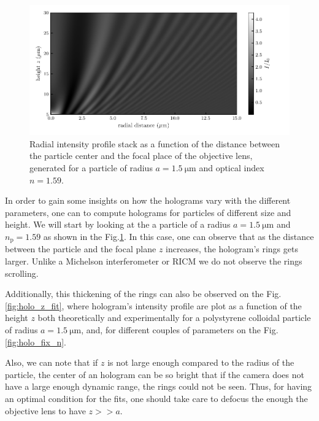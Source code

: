 \begin{figure}[H]
	\centering
	\includegraphics{02_body/chapter2/images/holo_size_exemple/holos_only_z.pdf}
	\caption{Radial intensity profile stack as a function of the distance between the particle center and the focal place of the objective lens, generated for a particle of radius $a = 1.5 ~\mathrm{\mu m}$ and optical index $n = 1.59$.}
	\label{fig:holo_onlyz}
\end{figure}

In order to gain some insights on how the holograms vary with the different parameters, one can to compute holograms for particles of different size and height. We will start by looking at the a particle of a radius $a = 1.5 ~ \mathrm{\mu m} $ and $n_\mathrm{p}= 1.59 $ as shown in the Fig.\ref{fig:holo_onlyz}. In this case, one can observe that as the distance between the particle and the focal plane $z$ increases, the hologram's rings gets larger. Unlike a Michelson interferometer or \gls{RICM} we do not observe the rings scrolling. 

Additionally, this thickening of the rings can also be observed on the Fig.\ref{fig:holo_z_fit}, where hologram's intensity profile are plot as a function of the height $z$ both theoretically and experimentally for a polystyrene colloidal particle of radius  $a = 1.5 ~ \mathrm{\mu m} $, and, for different couples of parameters on the Fig.\ref{fig:holo_fix_n}.

Also, we can note that if $z$ is not large enough compared to the radius of the particle, the center of an hologram can be so bright that if the camera does not have a large enough dynamic range, the rings could not be seen.  Thus, for having an optimal condition for the fits, one should take care to defocus the enough the objective lens to have $z >> a$.





